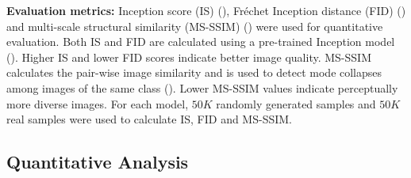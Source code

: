 \documentclass{article} %
\theoremstyle{plain}
\newtheorem*{proposition 1*}{Proposition 1}
\begin{document}
\textbf{Evaluation metrics:} Inception score (IS) (\cite{label_smooth2}), Fr\'echet Inception distance (FID) (\cite{ttur}) and multi-scale structural similarity (MS-SSIM) (\cite{ssim}) were used for quantitative evaluation. Both IS and FID are calculated using a pre-trained Inception model (\cite{label_smooth1}). Higher IS and lower FID scores indicate better image quality. MS-SSIM calculates the pair-wise image similarity and is used to detect mode collapses among images of the same class (\cite{acgan}). Lower MS-SSIM values indicate perceptually more diverse images. For each model, \(50K\) randomly generated samples and \(50K\) real samples were used to calculate IS, FID and MS-SSIM. 

\subsection{Quantitative Analysis}
\label{sec:exp:unsupervised_quantitative}
\end{document}
